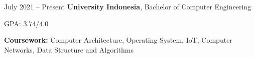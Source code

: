 \documentclass[../main.tex]{subfiles}
\begin{document}
\section{}
\begin{twocolentry}{
		July 2021 – Present
	}
	\textbf{University Indonesia}, Bachelor of Computer Engineering\end{twocolentry}

\vspace{0.10 cm}
\begin{onecolentry}
	\begin{highlights}
		\item GPA: 3.74/4.0
		\item \textbf{Coursework:} Computer Architecture, Operating System, IoT, Computer Networks, Data Structure and Algorithms
	\end{highlights}
\end{onecolentry}
\end{document}
